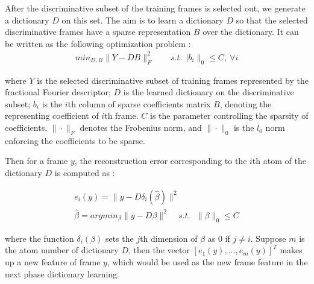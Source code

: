 \documentclass{article}
\begin{document}
After the discriminative subset of the training frames is selected out, we generate a dictionary $D$ on this set.
The aim is to learn a dictionary $D$ so that the selected discriminative frames  have a sparse representation $B$ over the dictionary.
It can be written as the following optimization problem  \cite{AharonKSVD}:
\begin{equation} \label{eq1}
 \begin{aligned}
min_{D,B}\|Y-DB\|_{F}^{2} \  \ \ \ \ \ \ \ \ s.t.\ \ |b_{i}\|_{0}\leq C ,\ \forall i
 \end{aligned}
\end{equation}

where $Y$ is the selected discriminative subset of training frames represented by the fractional Fourier descriptor;
$D$ is the learned dictionary on the discriminative subset; $b_{i}$ is the $i$th column of sparse coefficients matrix $B$, denoting the representing coefficient  of $i$th frame.
$C$ is the parameter controlling the sparsity of  coefficients.
$\|\cdot\|_{F}$ denotes the Frobenius norm, and $\|\cdot\|_{0}$  is the $l_{0}$ norm  enforcing the coefficients to be sparse.



Then for a frame $y$, the reconstruction error corresponding to the $i$th atom of the dictionary $D$ is computed as \cite{Pati93orthogonalmatching}:


\begin{equation} \label{eq1}
 \begin{aligned}
e_{i}(y)=\|y-D\delta_{i}(\hat{\beta})\|^{2}      \  \ \ \ \  \  \ \ \ \   \ \ \    \\
\hat{\beta}=argmin_{\beta}\|y-D\beta\|^{2}   \  \ \ \ \ s.t. \ \ \ \|\beta\|_{0}\leq C
 \end{aligned}
\end{equation}




where the function $\delta_{i}(\beta)$  sets the $j$th dimension of $\beta$ as 0 if $j\neq i$.
Suppose $m$ is the atom number of dictionary $D$,
then the vector $[e_{1}(y),...,e_{m}(y)]^{T}$ makes up a new feature of frame $y$, which would be used as the new frame feature in the next phase dictionary learning.
\end{document}
